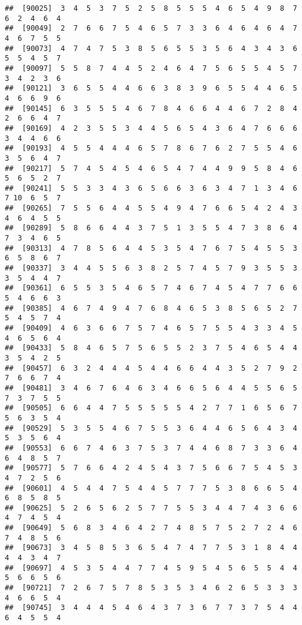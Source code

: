 \documentclass[
]{book}
\begin{document}
\begin{verbatim}
##  [90025]  3  4  5  3  7  5  2  5  8  5  5  5  4  6  5  4  9  8  7  6  2  4  6  4
##  [90049]  2  7  6  6  7  5  4  6  5  7  3  3  6  4  6  4  6  4  7  4  6  7  5  5
##  [90073]  4  7  4  7  5  3  8  5  6  5  5  3  5  6  4  3  4  3  6  5  5  4  5  7
##  [90097]  5  5  8  7  4  4  5  2  4  6  4  7  5  6  5  5  4  5  7  3  4  2  3  6
##  [90121]  3  6  5  5  4  4  6  6  3  8  3  9  6  5  5  4  4  6  5  4  6  6  9  6
##  [90145]  6  3  5  5  5  4  6  7  8  4  6  6  4  4  6  7  2  8  4  2  6  6  4  7
##  [90169]  4  2  3  5  5  3  4  4  5  6  5  4  3  6  4  7  6  6  6  3  4  4  6  6
##  [90193]  4  5  5  4  4  4  6  5  7  8  6  7  6  2  7  5  5  4  6  3  5  6  4  7
##  [90217]  5  7  4  5  4  5  4  6  5  4  7  4  4  9  9  5  8  4  6  5  6  5  2  7
##  [90241]  5  5  3  3  4  3  6  5  6  6  3  6  3  4  7  1  3  4  6  7 10  6  5  7
##  [90265]  7  5  5  6  4  4  5  5  4  9  4  7  6  6  5  4  2  4  3  4  6  4  5  5
##  [90289]  5  8  6  6  4  4  3  7  5  1  3  5  5  4  7  3  8  6  4  7  3  4  6  5
##  [90313]  4  7  8  5  6  4  4  5  3  5  4  7  6  7  5  4  5  5  3  6  5  8  6  7
##  [90337]  3  4  4  5  5  6  3  8  2  5  7  4  5  7  9  3  5  5  3  3  5  4  4  7
##  [90361]  6  5  5  3  5  4  6  5  7  4  6  7  4  5  4  7  7  6  6  5  4  6  6  3
##  [90385]  4  6  7  4  9  4  7  6  8  4  6  5  3  8  5  6  5  2  7  5  4  5  7  4
##  [90409]  4  6  3  6  6  7  5  7  4  6  5  7  5  5  4  3  3  4  5  4  6  5  6  4
##  [90433]  5  8  4  6  5  7  5  6  5  5  2  3  7  5  4  6  5  4  4  3  5  4  2  5
##  [90457]  6  3  2  4  4  4  5  4  4  6  6  4  4  3  5  2  7  9  2  7  6  6  7  4
##  [90481]  3  4  6  7  6  4  6  3  4  6  6  5  6  4  4  5  5  6  5  7  3  7  5  5
##  [90505]  6  6  4  4  7  5  5  5  5  5  4  2  7  7  1  6  5  6  7  5  6  3  5  4
##  [90529]  5  3  5  5  4  6  7  5  5  3  6  4  4  6  5  6  4  3  4  5  3  5  6  4
##  [90553]  6  6  7  4  6  3  7  5  3  7  4  4  6  8  7  3  3  6  4  6  4  8  5  7
##  [90577]  5  7  6  6  4  2  4  5  4  3  7  5  6  6  7  5  4  5  3  4  7  2  5  6
##  [90601]  4  5  4  4  7  5  4  4  5  7  7  7  5  3  8  6  6  5  4  6  8  5  8  5
##  [90625]  5  2  6  5  6  2  5  7  7  5  5  3  4  4  7  4  3  6  6  4  7  4  5  4
##  [90649]  5  6  8  3  4  6  4  2  7  4  8  5  7  5  2  7  2  4  6  7  4  8  5  6
##  [90673]  3  4  5  8  5  3  6  5  4  7  4  7  7  5  3  1  8  4  4  4  4  3  4  7
##  [90697]  4  5  3  5  4  4  7  7  4  5  9  5  4  5  6  5  5  4  4  5  6  6  5  6
##  [90721]  7  2  6  7  5  7  8  5  3  5  3  4  6  2  6  5  3  3  3  4  6  6  5  4
##  [90745]  3  4  4  4  5  4  6  4  3  7  3  6  7  7  3  7  5  4  4  6  4  5  5  4

\end{verbatim}
\end{document}
